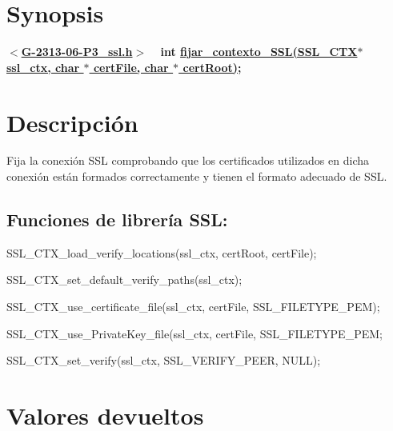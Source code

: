 \hypertarget{fijar_contexto_SSL_synopsis_6}{}\section{Synopsis}\label{fijar_contexto_SSL_synopsis_6}
{ {\bfseries $<$\hyperlink{G-2313-06-P3__ssl_8h}{G-\/2313-\/06-\/\+P3\+\_\+ssl.\+h}$>$} ~\newline
 {\bfseries int \hyperlink{G-2313-06-P3__ssl_8c_a006acb44fc7dae799271a48117f5a398}{fijar\+\_\+contexto\+\_\+\+S\+S\+L(\+S\+S\+L\+\_\+\+C\+T\+X$\ast$ ssl\+\_\+ctx, char $\ast$ cert\+File, char $\ast$ cert\+Root)};} } \hypertarget{fijar_contexto_SSL_descripcion_6}{}\section{Descripción}\label{fijar_contexto_SSL_descripcion_6}
Fija la conexión S\+SL comprobando que los certificados utilizados en dicha conexión están formados correctamente y tienen el formato adecuado de S\+SL. ~\newline
\subsection*{{\bfseries Funciones de librería S\+SL\+:}}


\begin{DoxyItemize}
\item S\+S\+L\+\_\+\+C\+T\+X\+\_\+load\+\_\+verify\+\_\+locations(ssl\+\_\+ctx, cert\+Root, cert\+File); 
\item S\+S\+L\+\_\+\+C\+T\+X\+\_\+set\+\_\+default\+\_\+verify\+\_\+paths(ssl\+\_\+ctx); 
\item S\+S\+L\+\_\+\+C\+T\+X\+\_\+use\+\_\+certificate\+\_\+file(ssl\+\_\+ctx, cert\+File, S\+S\+L\+\_\+\+F\+I\+L\+E\+T\+Y\+P\+E\+\_\+\+P\+E\+M); 
\item S\+S\+L\+\_\+\+C\+T\+X\+\_\+use\+\_\+\+Private\+Key\+\_\+file(ssl\+\_\+ctx, cert\+File, S\+S\+L\+\_\+\+F\+I\+L\+E\+T\+Y\+P\+E\+\_\+\+P\+EM; 
\item S\+S\+L\+\_\+\+C\+T\+X\+\_\+set\+\_\+verify(ssl\+\_\+ctx, S\+S\+L\+\_\+\+V\+E\+R\+I\+F\+Y\+\_\+\+P\+E\+E\+R, N\+U\+L\+L); 
\end{DoxyItemize}\hypertarget{fijar_contexto_SSL_return_6}{}\section{Valores devueltos}\label{fijar_contexto_SSL_return_6}

